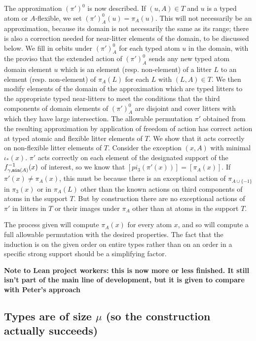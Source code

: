 \documentclass[112pt]{article}
\begin{document}
\begin{description}
The approximation $(\pi')^0$ is now described.  If $(u,A) \in T$ and $u$ is a typed atom or $A$-flexible, we set $(\pi')^0_A(u) = \pi_A(u)$.
This will not necessarily be an approximation, because its domain is not necessarily the same as its range;  there is also a correction needed for near-litter elements of the domain, to be discussed below.  We fill in orbits under $(\pi')^0_A$ for each
typed atom $u$ in the domain, with the proviso that the extended action of $(\pi')^0_A$ sends any new typed atom domain element $u$ which is an element (resp. non-element) of a litter $L$ to an element (resp. non-element) of $\pi_A(L)$ for each $L$ with $(L,A) \in T$.
We then modify elements of the domain of the approximation which are typed litters to the appropriate typed near-litters to meet the conditions
that the third components of domain elements of $(\pi')^0_A$ are disjoint and cover litters with which they have large intersection.  The allowable permutation $\pi'$ obtained from the resulting
approximation by application of freedom of action has correct action at typed atomic and flexible litter elements of $T$.  We show that it acts correctly on non-flexible litter elements of $T$.  Consider the exception $(x,A)$ with minimal $\iota_*(x)$.  $\pi'$ acts correctly on each element of the designated support of the $f_{\gamma,{\tt min}(A)}^{-1}(x)$ of interest, so we know that $[pi_3(\pi'(x))]=[\pi_A(x)]$.  If $\pi'(x) \neq \pi_A(x)$, this must be because there is an exceptional action of $\pi_{A \cup \{-1\}}$  in $\pi_3(x)$ or in $\pi_A(L)$ other than the known actions on third components of atoms in the support $T$.  But by construction there are no exceptional actions of $\pi'$ in litters in $T$ or their images under $\pi_A$ other than at atoms in the support $T$.

The process given will compute $\pi_A(x)$ for every atom $x$, and so will compute a full allowable permutation with the desired properties.  The fact
that the induction is on the given order on entire types rather than on an order in a specific strong support should be a simplifying factor.

\end{description}

{\bf Note to Lean project workers:  this is now more or less finished.  It still isn't part of the main line of development, but it is given to compare with Peter's approach}

\newpage
\subsection{Types are of size $\mu$ (so the construction actually succeeds)}
\end{document}

